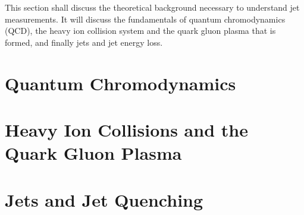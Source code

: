 
This section shall discuss the theoretical background necessary to understand jet measurements. It will discuss the fundamentals of quantum chromodynamics (QCD), the heavy ion collision system and the quark gluon plasma that is formed, and finally jets and jet energy loss. 


\section{Quantum Chromodynamics}
\label{sec:qcd}


\section{Heavy Ion Collisions and the Quark Gluon Plasma}
\label{sec:HICollisions}


\section{Jets and Jet Quenching}
\label{sec:jets}

